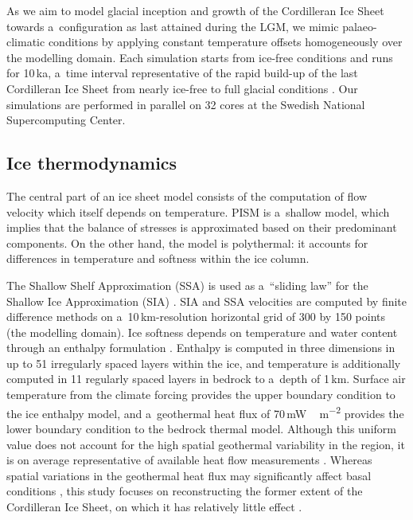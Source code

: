 \documentclass[tc, ms]{copernicus}
\begin{document}
As we aim to model glacial inception and growth of the Cordilleran Ice Sheet towards a~configuration as last attained during the LGM, we mimic palaeo-climatic conditions by applying constant temperature offsets homogeneously over the modelling domain. Each simulation starts from ice-free conditions and runs for 10\,ka, a~time interval representative of the rapid build-up of the last Cordilleran Ice Sheet from nearly ice-free to full glacial conditions \citep{clague-1989,stroeven-etal-2010}. Our simulations are performed in parallel on 32 cores at the Swedish National Supercomputing Center.

\subsection{Ice thermodynamics}

The central part of an ice sheet model consists of the computation of flow velocity which itself depends on temperature. PISM is a~shallow model, which implies that the balance of stresses is approximated based on their predominant components. On the other hand, the model is polythermal: it accounts for differences in temperature and softness within the ice column.

The Shallow Shelf Approximation (SSA) is used as a~``sliding law'' for the Shallow Ice Approximation (SIA) \citep{bueler-brown-2009,winkelmann-etal-2011}. SIA and SSA velocities are computed by finite difference methods on a~10\,km-resolution horizontal grid of 300 by 150 points (the modelling domain). Ice softness depends on temperature and water content through an enthalpy formulation \citep{aschwanden-blatter-2009,aschwanden-etal-2012}. Enthalpy is computed in three dimensions in up to 51 irregularly spaced layers within the ice, and temperature is additionally computed in 11 regularly spaced layers in bedrock to a~depth of 1\,km. Surface air temperature from the climate forcing provides the upper boundary condition to the ice enthalpy model, and a~geothermal heat flux of 70\,\unit{mW\,m^{-2}} provides the lower boundary condition to the bedrock thermal model. Although this uniform value does not account for the high spatial geothermal variability in the region, it is on average representative of available heat flow measurements \citep{artemieva-mooney-2001,blackwell-richards-2004}. Whereas spatial variations in the geothermal heat flux may significantly affect basal conditions \citep{pattyn-2010}, this study focuses on reconstructing the former extent of the Cordilleran Ice Sheet, on which it has relatively little effect \citep{rogozhina-etal-2012}.
\end{document}
